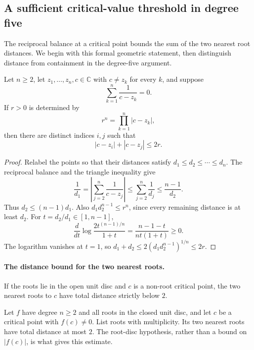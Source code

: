 \subsection*{A sufficient critical-value threshold in degree five}

The reciprocal balance at a critical point bounds the sum of the two
nearest root distances. We begin with this formal geometric statement,
then distinguish distance from containment in the degree-five argument.

\begin{theorem}
\label{res:critical-proximity}
Let $n\ge2$, let $z_1,\ldots,z_n,c\in\mathbb C$ with $c\ne z_k$ for every
$k$, and suppose
\[
  \sum_{k=1}^n\frac1{c-z_k}=0.
\]
If $r>0$ is determined by
\[
  r^n=\prod_{k=1}^n|c-z_k|,
\]
then there are distinct indices $i,j$ such that
\[
  |c-z_i|+|c-z_j|\le2r.
\]
\end{theorem}
\begin{proof}
Relabel the points so that their distances satisfy
$d_1\le d_2\le\cdots\le d_n$. The reciprocal balance and the triangle
inequality give
\[
 \frac1{d_1}
 =\left|\sum_{j=2}^n\frac1{c-z_j}\right|
 \le\sum_{j=2}^n\frac1{d_j}\le\frac{n-1}{d_2}.
\]
Thus $d_2\le(n-1)d_1$. Also $d_1d_2^{n-1}\le r^n$, since every
remaining distance is at least $d_2$. For $t=d_2/d_1\in[1,n-1]$,
\[
 \frac{d}{dt}\log\frac{2t^{(n-1)/n}}{1+t}
       =\frac{n-1-t}{nt(1+t)}\ge0.
\]
The logarithm vanishes at $t=1$, so
$d_1+d_2\le2(d_1d_2^{n-1})^{1/n}\le2r$.
\end{proof}

\paragraph{The distance bound for the two nearest roots.}
\hypertarget{two-nearest-root-distance}{}
\begin{corollary}\label{res:two-nearest-roots}
If the roots lie in the open unit disc and $c$ is a non-root critical point,
the two nearest roots to $c$ have total distance strictly below $2$.
\end{corollary}

Let $f$ have degree $n\ge2$ and all roots in the closed unit disc, and
let $c$ be a critical point with $f(c)\ne0$. List roots with multiplicity.
Its two nearest roots have
total distance at most $2$. The root-disc hypothesis, rather than a bound
on $|f(c)|$, is what gives this estimate.

